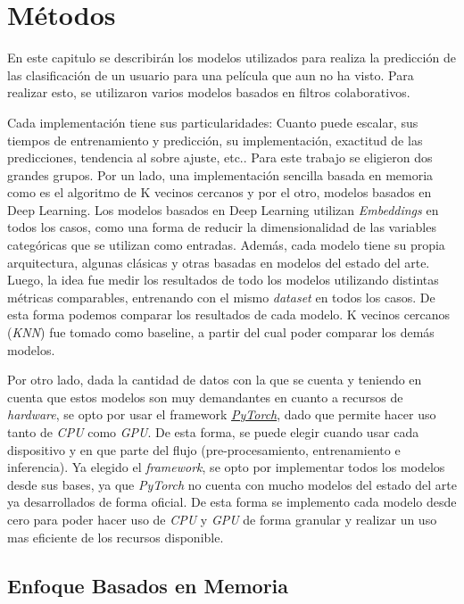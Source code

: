\documentclass[11pt,a4paper,twoside]{thesis}
\begin{document}
\chapter{Métodos}

En este capitulo se describirán los modelos utilizados para realiza la
predicción de las clasificación de un usuario para una película que aun no ha
visto. Para realizar esto, se utilizaron varios modelos basados en filtros
colaborativos.

Cada implementación tiene sus particularidades: Cuanto puede escalar, sus
tiempos de entrenamiento y predicción, su implementación, exactitud de las
predicciones, tendencia al sobre ajuste, etc.. Para este trabajo se eligieron
dos grandes grupos. Por un lado, una implementación sencilla basada en memoria
como es el algoritmo de K vecinos cercanos y por el otro, modelos basados en
Deep Learning. Los modelos basados en Deep Learning utilizan
\textit{Embeddings} en todos los casos, como una forma de reducir la
dimensionalidad de las variables categóricas que se utilizan como entradas.
Además, cada modelo tiene su propia arquitectura, algunas clásicas y otras
basadas en modelos del estado del arte. Luego, la idea fue medir los resultados
de todo los modelos utilizando distintas métricas comparables, entrenando con
el mismo \textit{dataset} en todos los casos. De esta forma podemos comparar
los resultados de cada modelo. K vecinos cercanos (\textit{KNN}) fue tomado
como baseline, a partir del cual poder comparar los demás modelos.

Por otro lado, dada la cantidad de datos con la que se cuenta y teniendo en
cuenta que estos modelos son muy demandantes en cuanto a recursos de
\textit{hardware}, se opto por usar el framework
\href{https://pytorch.org/}{\textit{PyTorch}}, dado que permite hacer uso tanto
de \textit{CPU} como \textit{GPU}. De esta forma, se puede elegir cuando usar
cada dispositivo y en que parte del flujo (pre-procesamiento, entrenamiento e
inferencia). Ya elegido el \textit{framework}, se opto por implementar todos
los modelos desde sus bases, ya que \textit{PyTorch} no cuenta con mucho
modelos del estado del arte ya desarrollados de forma oficial. De esta forma se
implemento cada modelo desde cero para poder hacer uso de \textit{CPU} y
\textit{GPU} de forma granular y realizar un uso mas eficiente de los recursos
disponible.

\section{Enfoque Basados en Memoria}
\end{document}
